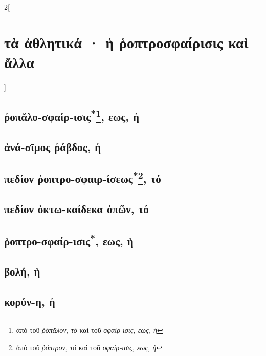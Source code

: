 \documentclass{book}
\begin{document}
\newpage  %
\begin{multicols}{2}[\section{τὰ ἀθλητικά · ἡ ῥοπτροσφαίρισις καὶ ἄλλα}]
\subsection{ῥοπᾰλο-σφαίρ-ισις\textsuperscript{*}\protect\footnote{ἀπὸ τοῦ \emph{ῥόπᾰλον, τό} καὶ τοῦ \emph{σφαίρ-ισις, εως, ἡ}}, εως, ἡ}
\subsection{ἀνά-σῑμος ῥάβδος, ἡ}
\subsection{πεδίον ῥοπτρο-σφαιρ-ίσεως\textsuperscript{*}\protect\footnote{ἀπὸ τοῦ \emph{ῥόπτρον, τό} καὶ τοῦ \emph{σφαίρ-ισις, εως, ἡ}}, τό}
\subsection{πεδίον ὀκτω-καίδεκα ὀπῶν, τό}
\subsection{ῥοπτρο-σφαίρ-ισις\textsuperscript{*\number\value{footnote}}, εως, ἡ}
\subsection{βολή, ἡ}
\subsection{κορύν-η, ἡ}

\end{multicols}
\end{document}
